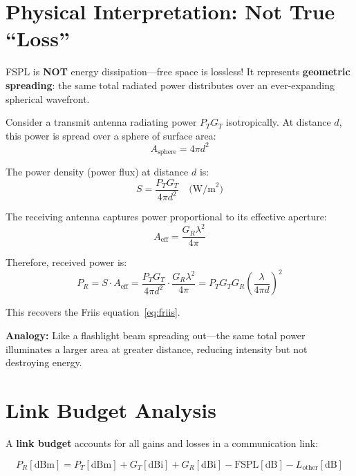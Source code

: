 \section{Physical Interpretation: Not True ``Loss''}
\label{sec:physical-interpretation}

\begin{keyconcept}
FSPL is \textbf{NOT} energy dissipation---free space is lossless! It represents \textbf{geometric spreading}: the same total radiated power distributes over an ever-expanding spherical wavefront.
\end{keyconcept}

Consider a transmit antenna radiating power $P_T G_T$ isotropically. At distance $d$, this power is spread over a sphere of surface area:
\begin{equation}
A_{\text{sphere}} = 4\pi d^2
\end{equation}

The power density (power flux) at distance $d$ is:
\begin{equation}
S = \frac{P_T G_T}{4\pi d^2} \quad \text{(W/m}^2\text{)}
\end{equation}

The receiving antenna captures power proportional to its effective aperture:
\begin{equation}
A_{\text{eff}} = \frac{G_R \lambda^2}{4\pi}
\end{equation}

Therefore, received power is:
\begin{equation}
P_R = S \cdot A_{\text{eff}} = \frac{P_T G_T}{4\pi d^2} \cdot \frac{G_R \lambda^2}{4\pi} = P_T G_T G_R \left(\frac{\lambda}{4\pi d}\right)^2
\end{equation}

This recovers the Friis equation~\eqref{eq:friis}.

\textbf{Analogy:} Like a flashlight beam spreading out---the same total power illuminates a larger area at greater distance, reducing intensity but not destroying energy.

\section{Link Budget Analysis}
\label{sec:link-budget}

A \textbf{link budget} accounts for all gains and losses in a communication link:

\begin{equation}
\boxed{P_R[\text{dBm}] = P_T[\text{dBm}] + G_T[\text{dBi}] + G_R[\text{dBi}] - \text{FSPL}[\text{dB}] - L_{\text{other}}[\text{dB}]}
\label{eq:link-budget}
\end{equation}

